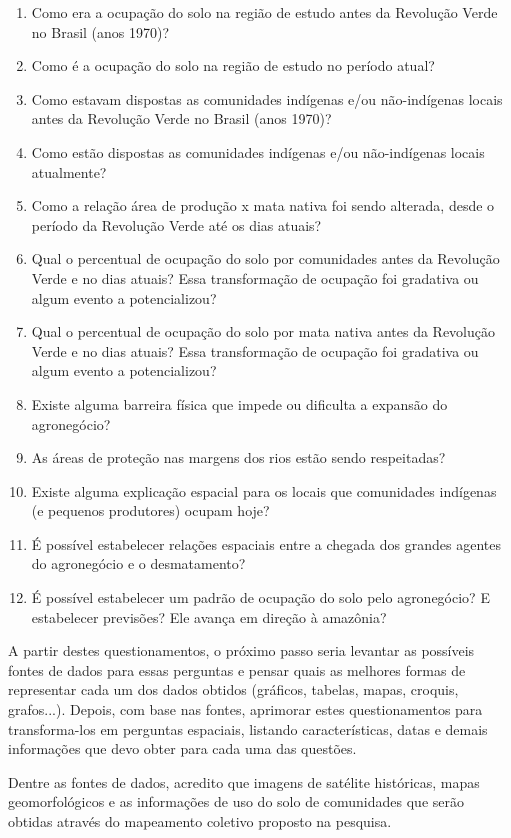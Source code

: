 \begin{enumerate}
  \item Como era a ocupação do solo na região de estudo antes da Revolução Verde no Brasil (anos 1970)?
  \item Como é a ocupação do solo na região de estudo no período atual?
  \item Como estavam dispostas as comunidades indígenas e/ou não-indígenas locais antes da Revolução Verde no Brasil (anos 1970)?
  \item Como estão dispostas as comunidades indígenas e/ou não-indígenas locais atualmente?
  \item Como a relação área de produção x mata nativa foi sendo alterada, desde o período da Revolução Verde até os dias atuais?
  \item Qual o percentual de ocupação do solo por comunidades antes da Revolução Verde e no dias atuais? Essa transformação de ocupação foi gradativa ou algum evento a potencializou?
  \item Qual o percentual de ocupação do solo por mata nativa antes da Revolução Verde e no dias atuais? Essa transformação de ocupação foi gradativa ou algum evento a potencializou?
  \item Existe alguma barreira física que impede ou dificulta a expansão do agronegócio?
  \item As áreas de proteção nas margens dos rios estão sendo respeitadas?
  \item Existe alguma explicação espacial para os locais que comunidades indígenas (e pequenos produtores) ocupam hoje?
  \item É possível estabelecer relações espaciais entre a chegada dos grandes agentes do agronegócio e o desmatamento?
  \item É possível estabelecer um padrão de ocupação do solo pelo agronegócio? E estabelecer previsões? Ele avança em direção à amazônia?
\end{enumerate}

A partir destes questionamentos, o próximo passo seria levantar as possíveis fontes de dados para essas perguntas e pensar quais as melhores formas de representar cada um dos dados obtidos (gráficos, tabelas, mapas, croquis, grafos...). Depois, com base nas fontes, aprimorar estes questionamentos para transforma-los em perguntas espaciais, listando características, datas e demais informações que devo obter para cada uma das questões.

Dentre as fontes de dados, acredito que imagens de satélite históricas, mapas geomorfológicos e as informações de uso do solo de comunidades que serão obtidas através do mapeamento coletivo proposto na pesquisa.


